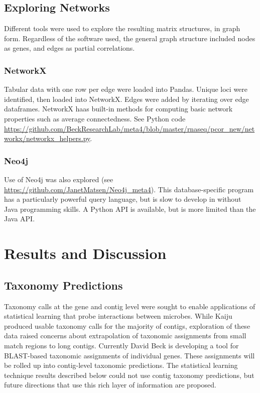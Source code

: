 \subsection{Exploring Networks}
Different tools were used to explore the resulting matrix structures, in graph form.
Regardless of the software used, the general graph structure included nodes as genes, and edges as partial correlations.

\subsubsection{NetworkX}
Tabular data with one row per edge were loaded into Pandas.
Unique loci were identified, then loaded into NetworkX.
Edges were added by iterating over edge dataframes.
NetworkX haas built-in methods for computing basic network properties such as average connectedness.
See Python code \url{https://github.com/BeckResearchLab/meta4/blob/master/rnaseq/pcor_new/networkx/networkx_helpers.py}.

\subsubsection{Neo4j}
Use of Neo4j was also explored (see \url{https://github.com/JanetMatsen/Neo4j_meta4}).
This database-specific program has a particularly powerful query language, but is slow to develop in without Java programming skills.
A Python API is available, but is more limited than the Java API.


\section{Results and Discussion}

\subsection{Taxonomy Predictions}
\label{results:taxonomy}
Taxonomy calls at the gene and contig level were sought to enable applications of statistical learning that probe interactions between microbes.
While Kaiju produced usable taxonomy calls for the majority of contigs, exploration of these data raised concerns about extrapolation of taxonomic assignments from small match regions to long contigs. %
Currently David Beck is developing a tool for BLAST-based taxonomic assignments of individual genes.
These assignments will be rolled up into contig-level taxonomic predictions.
The statistical learning technique results described below could not use contig taxonomy predictions, but future directions that use this rich layer of information are proposed.

